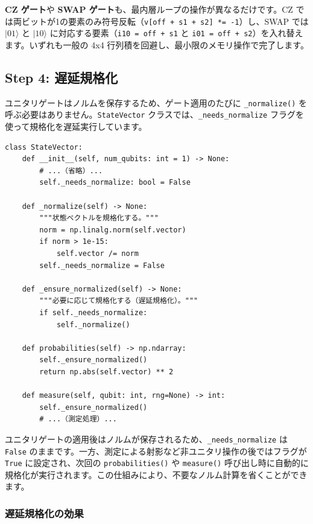 \textbf{CZ ゲート}や \textbf{SWAP ゲート}も、最内層ループの操作が異なるだけです。CZ では両ビットが1の要素のみ符号反転（\texttt{v[off + s1 + s2] *= -1}）し、SWAP では $|01\rangle$ と $|10\rangle$ に対応する要素（\texttt{i10 = off + s1} と \texttt{i01 = off + s2}）を入れ替えます。いずれも一般の 4x4 行列積を回避し、最小限のメモリ操作で完了します。

\subsection{Step 4: 遅延規格化}

ユニタリゲートはノルムを保存するため、ゲート適用のたびに \texttt{\_normalize()} を呼ぶ必要はありません。\texttt{StateVector} クラスでは、\texttt{\_needs\_normalize} フラグを使って規格化を遅延実行しています。

\begin{lstlisting}[caption=遅延規格化の実装（qubit.py）, label=src:delayed_normalize]
class StateVector:
    def __init__(self, num_qubits: int = 1) -> None:
        # ...（省略）...
        self._needs_normalize: bool = False

    def _normalize(self) -> None:
        """状態ベクトルを規格化する。"""
        norm = np.linalg.norm(self.vector)
        if norm > 1e-15:
            self.vector /= norm
        self._needs_normalize = False

    def _ensure_normalized(self) -> None:
        """必要に応じて規格化する（遅延規格化）。"""
        if self._needs_normalize:
            self._normalize()

    def probabilities(self) -> np.ndarray:
        self._ensure_normalized()
        return np.abs(self.vector) ** 2

    def measure(self, qubit: int, rng=None) -> int:
        self._ensure_normalized()
        # ...（測定処理）...
\end{lstlisting}

ユニタリゲートの適用後はノルムが保存されるため、\texttt{\_needs\_normalize} は \texttt{False} のままです。一方、測定による射影など非ユニタリ操作の後ではフラグが \texttt{True} に設定され、次回の \texttt{probabilities()} や \texttt{measure()} 呼び出し時に自動的に規格化が実行されます。この仕組みにより、不要なノルム計算を省くことができます。

\subsubsection{遅延規格化の効果}

